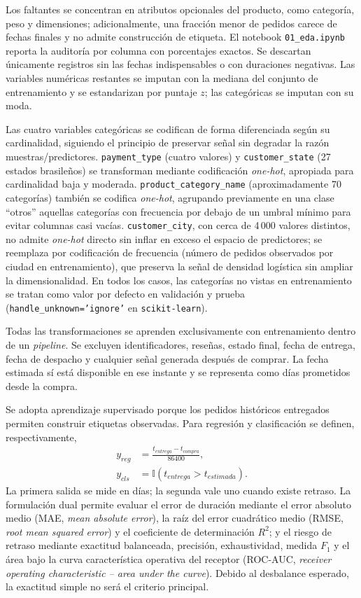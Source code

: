 \documentclass[journal]{IEEEtran}
\begin{document}
Los faltantes se concentran en atributos opcionales del producto, como categoría, peso y dimensiones; adicionalmente, una fracción menor de pedidos carece de fechas finales y no admite construcción de etiqueta. El notebook \texttt{01\_eda.ipynb} reporta la auditoría por columna con porcentajes exactos. Se descartan únicamente registros sin las fechas indispensables o con duraciones negativas. Las variables numéricas restantes se imputan con la mediana del conjunto de entrenamiento y se estandarizan por puntaje $z$; las categóricas se imputan con su moda.

Las cuatro variables categóricas se codifican de forma diferenciada según su cardinalidad, siguiendo el principio de preservar señal sin degradar la razón muestras/predictores. \texttt{payment\_type} (cuatro valores) y \texttt{customer\_state} (27 estados brasileños) se transforman mediante codificación \emph{one-hot}, apropiada para cardinalidad baja y moderada. \texttt{product\_category\_name} (aproximadamente 70 categorías) también se codifica \emph{one-hot}, agrupando previamente en una clase ``otros'' aquellas categorías con frecuencia por debajo de un umbral mínimo para evitar columnas casi vacías. \texttt{customer\_city}, con cerca de 4\,000 valores distintos, no admite \emph{one-hot} directo sin inflar en exceso el espacio de predictores; se reemplaza por codificación de frecuencia (número de pedidos observados por ciudad en entrenamiento), que preserva la señal de densidad logística sin ampliar la dimensionalidad. En todos los casos, las categorías no vistas en entrenamiento se tratan como valor por defecto en validación y prueba (\texttt{handle\_unknown='ignore'} en \texttt{scikit-learn}).

Todas las transformaciones se aprenden exclusivamente con entrenamiento dentro de un \emph{pipeline}. Se excluyen identificadores, reseñas, estado final, fecha de entrega, fecha de despacho y cualquier señal generada después de comprar. La fecha estimada sí está disponible en ese instante y se representa como días prometidos desde la compra.

Se adopta aprendizaje supervisado porque los pedidos históricos entregados permiten construir etiquetas observadas. Para regresión y clasificación se definen, respectivamente,
\begin{equation}
\begin{aligned}
y_{reg}&=\frac{t_{entrega}-t_{compra}}{86400},\\
y_{cls}&=\mathbb{I}(t_{entrega}>t_{estimada}).
\end{aligned}
\end{equation}
La primera salida se mide en días; la segunda vale uno cuando existe retraso. La formulación dual permite evaluar el error de duración mediante el error absoluto medio (MAE, \textit{mean absolute error}), la raíz del error cuadrático medio (RMSE, \textit{root mean squared error}) y el coeficiente de determinación $R^2$; y el riesgo de retraso mediante exactitud balanceada, precisión, exhaustividad, medida $F_1$ y el área bajo la curva característica operativa del receptor (ROC-AUC, \textit{receiver operating characteristic -- area under the curve}). Debido al desbalance esperado, la exactitud simple no será el criterio principal.
\end{document}
